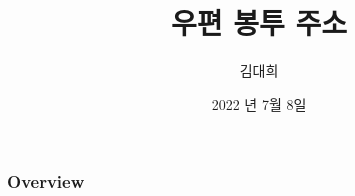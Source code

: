 \documentclass[aspectratio=1610,12pt,xcolor=pdftex,dvipsnames,table,handout]{beamer}
\begin{document}
	

			\title{우편 봉투 주소}
			\author{김대희}

			\date{ 2022 년 7월 8일 }




		\begin{frame}[plain]
		\titlepage
		\end{frame}



		\begin{frame}[allowframebreaks]
		\frametitle{Overview}
					\tableofcontents
		\end{frame}







\end{document}
